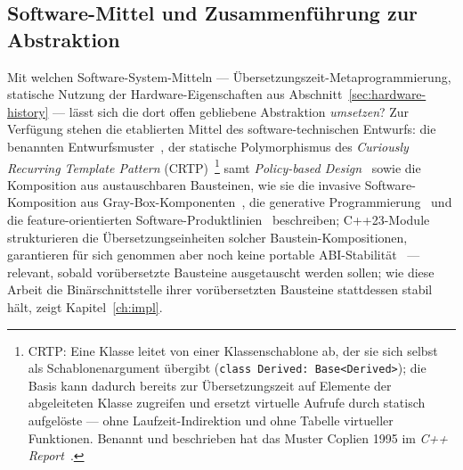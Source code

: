 \begin{nurlang}
\section{Software-Mittel und Zusammenführung zur Abstraktion}\label{sec:software-means}
Mit welchen Software-System-Mitteln --- Übersetzungszeit-Metaprogrammierung, statische Nutzung der
Hardware-Eigenschaften aus Abschnitt~\ref{sec:hardware-history} --- lässt sich die dort offen gebliebene
Abstraktion \emph{umsetzen}? Zur
Verfügung stehen die etablierten Mittel des software-technischen Entwurfs: die benannten
Entwurfsmuster~\cite{gamma1994patterns}, der statische Polymorphismus des \emph{Curiously Recurring
Template Pattern} (CRTP)~\cite{coplien1995crtp,vandevoorde2017templates}\footnote{CRTP\@: Eine Klasse
leitet von einer Klassenschablone ab, der sie sich selbst als Schablonenargument übergibt
(\texttt{class Derived: Base<Derived>}); die Basis kann dadurch bereits zur Übersetzungszeit auf Elemente der
abgeleiteten Klasse zugreifen und ersetzt virtuelle Aufrufe durch statisch aufgelöste --- ohne
Laufzeit-Indirektion und ohne Tabelle virtueller Funktionen. Benannt und beschrieben hat das Muster
Coplien 1995 im \emph{C++ Report}~\cite{coplien1995crtp}.} samt \emph{Policy-based
Design}~\cite{alexandrescu2001modern} sowie die Komposition aus
austauschbaren Bausteinen, wie sie die invasive Software-Komposition aus
Gray-Box-Komponenten~\cite{assmann2003invasive}, die generative Programmierung~\cite{czarnecki2000generative}
und die feature-orientierten Software-Produktlinien~\cite{apel2013feature,batory1992hierarchical}
beschreiben; C++23-Module strukturieren die Übersetzungseinheiten solcher Baustein-Kompositionen,
garantieren für sich genommen aber noch
keine portable ABI-Stabilität~\cite{wg21_modules_abi} --- relevant, sobald vorübersetzte Bausteine
ausgetauscht werden sollen; wie diese Arbeit die Binärschnittstelle ihrer vorübersetzten Bausteine
stattdessen stabil hält, zeigt Kapitel~\ref{ch:impl}.


\end{nurlang}
